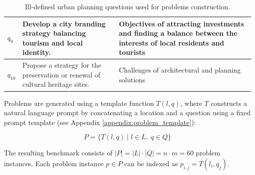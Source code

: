 \begin{table}[h]
\begin{tabularx}{\textwidth}{l | X X}
\midrule

$q_9$ & Develop a city branding strategy balancing tourism and local identity. & Objectives of attracting investments and finding a balance between the interests of local residents and tourists \\

\midrule

$q_{10}$ & Propose a strategy for the preservation or renewal of cultural heritage sites. & Challenges of architectural and planning solutions \\
\hline
\end{tabularx}
\caption{Ill-defined urban planning questions used for problems construction.}
\label{table:ill-defined_questions}
\end{table}

Problems are generated using a template function $T(l, q)$, where $T$ constructs a natural language prompt by concatenating a location and a question using a fixed prompt template (see Appendix \ref{appendix:problem_template}):

\[
P = \{ T(l, q) \mid l \in L,\; q \in Q \}
\]

The resulting benchmark consists of $|P| = |L| \cdot |Q| = n \cdot m = 60$ problem instances.
Each problem instance $p \in P$ can be indexed as $p_{i,j} = T(l_i, q_j)$.